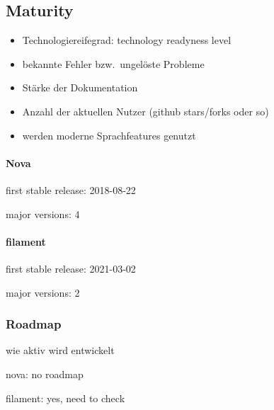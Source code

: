 \subsection{Maturity}
\begin{itemize}
    \item Technologiereifegrad: technology readyness level
    \item bekannte Fehler bzw.\ ungelöste Probleme
    \item Stärke der Dokumentation
    \item Anzahl der aktuellen Nutzer (github stars/forks oder so)
    \item werden moderne Sprachfeatures genutzt
\end{itemize}

\paragraph{Nova}
first stable release: 2018-08-22

major versions: 4

\paragraph{filament}
first stable release: 2021-03-02

major versions: 2

\subsubsection{Roadmap}
wie aktiv wird entwickelt

nova: no roadmap

filament: yes, need to check
